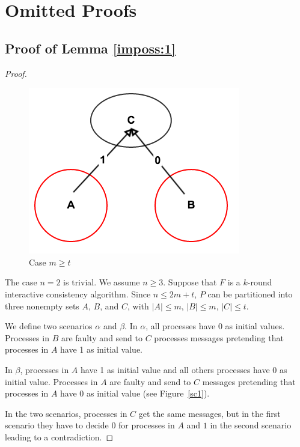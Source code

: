 
\section{Omitted Proofs}

\subsection{Proof of Lemma \ref{imposs:1}} \label{app:imposs:1}
\begin{proof}
\begin{figure}[h]
  \centering
  \includegraphics[scale=0.35]{impossible1.png}
  \caption{Case $m \geqslant t$  }
\end{figure}\label{sc1}

  The case $n=2$ is trivial. We assume $n \geqslant 3$.
  Suppose that $F$ is a $k$-round interactive consistency algorithm. Since $n \leqslant
  2m+t$, $P$ can be partitioned into three nonempty sets $A$, $B$, and $C$,
  with $| A | \leqslant m$, $| B | \leqslant m$, $| C | \leqslant t$. 
  
  We define two scenarios $\alpha$ and $\beta$.
  In $\alpha$, all processes have 0 as initial values.
  Processes in $B$ are faulty and send  to $C$ processes messages
  pretending that processes in $A$ have 1 as initial value.
  
   In $\beta$, processes in $A$ have 1 as initial value and all  others processes have 0 as initial value.
  Processes in $A$ are faulty and send to $C$ messages 
  pretending that processes in $A$ have 0 as initial value (see Figure~\ref{sc1}).
  
  In the two scenarios, processes in $C$ get the same messages, but in the first scenario 
  they have to decide 0 for processes in $A$ and $1$ in the second scenario leading to a contradiction.
    

\end{proof}
